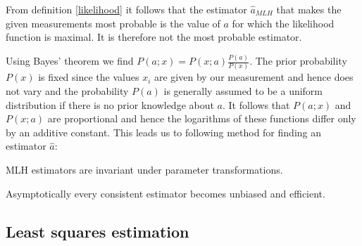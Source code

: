 {    From definition \ref{likelihood} it follows that the estimator $\hat{a}_{MLH}$ that makes the given measurements most probable is the value of $a$ for which the likelihood function is maximal. It is therefore not the most probable estimator.

    Using Bayes' theorem we find $P(a;x) = P(x;a)\frac{P(a)}{P(x)}$. The prior probability $P(x)$ is fixed since the values $x_i$ are given by our measurement and hence does not vary and the probability $P(a)$ is generally assumed to be a uniform distribution if there is no prior knowledge about $a$. It follows that $P(a;x)$ and $P(x;a)$ are proportional and hence the logarithms of these functions differ only by an additive constant. This leads us to following method for finding an estimator $\hat{a}$:

    \begin{property}
        MLH estimators are invariant under parameter transformations.
    \end{property}

    \begin{property}
        Asymptotically every consistent estimator becomes unbiased and efficient.
    \end{property}

\subsection{Least squares estimation}

}
